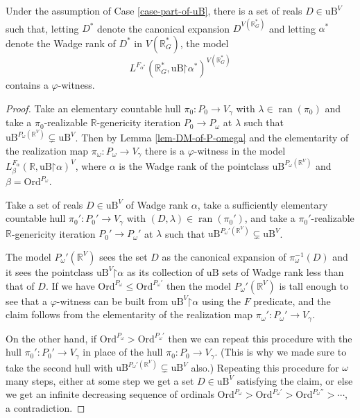 \documentclass[fleqn, 11pt]{amsart}
\theoremstyle{plain}
\theoremstyle{definition}
\theoremstyle{remark}
\newcommand{\Ord}{\mathrm{Ord}}
\newcommand{\uB}{\mathrm{uB}}
\newcommand{\restrict}{\mathord{\restriction}}
\DeclareMathOperator{\ran}{ran}
\begin{document}
\begin{claim*}
 Under the assumption of Case \ref{case-part-of-uB}, there is a
 set of reals $D \in \uB^V$ such that, letting $D^*$ denote the canonical expansion $D^{V(\mathbb{R}^*_G)}$ and letting $\alpha^*$ denote the Wadge rank of $D^*$ in $V(\mathbb{R}^*_G)$, the model
\[L^{F_{\alpha^*}}(\mathbb{R}^*_G, \uB \restrict \alpha^*)^{V(\mathbb{R}^*_G)}\]
 contains a $\varphi$-witness.
\end{claim*}

\begin{proof}
 Take an elementary countable hull $\pi_0 \colon P_0 \to V_{\gamma}$ with $\lambda \in \ran(\pi_0)$ and take a $\pi_0$-realizable $\mathbb{R}$-genericity iteration $P_0\to P_\omega$ at $\lambda$ such that $\uB^{P_\omega(\mathbb{R}^V)} \subsetneq \uB^V$. Then by Lemma \ref{lem-DM-of-P-omega} and the elementarity of the realization map $\pi_\omega \colon P_\omega \to V_{\gamma}$ there is a $\varphi$-witness in the model $L^{F_\alpha}_\beta(\mathbb{R}, \uB \restrict \alpha)^V$, where $\alpha$ is the Wadge rank of the pointclass $\uB^{P_\omega(\mathbb{R}^V)}$ and $\beta = \Ord^{P_\omega}$.

 Take a set of reals $D \in \uB^V$ of Wadge rank $\alpha$, take a sufficiently elementary countable hull $\pi_0' \colon P_0' \to V_{\gamma}$ with $(D, \lambda) \in \ran(\pi_0')$, and take a $\pi_0'$-realizable $\mathbb{R}$-genericity iteration $P_0'\to P_\omega'$ at $\lambda$ such that $\uB^{P_\omega'(\mathbb{R}^V)} \subsetneq \uB^V$.

 The model $P_\omega'(\mathbb{R}^V)$ sees the set $D$ as the canonical expansion of $\pi_\omega^{-1}(D)$ and it sees the pointclass $\uB^V \restrict \alpha$ as its collection of $\uB$ sets of Wadge rank less than that of $D$. If we have $\Ord^{P_\omega} \le \Ord^{P_\omega'}$ then the model $P_\omega'(\mathbb{R}^V)$ is tall enough to see that a $\varphi$-witness can be built from $\uB^V \restrict \alpha$ using the $F$ predicate, and the claim follows from the elementarity of the realization map $\pi_\omega' \colon P_\omega' \to V_{\gamma}$.

 On the other hand, if $\Ord^{P_\omega} > \Ord^{P_\omega'}$ then we can repeat this procedure with the hull $\pi_0' \colon P_0' \to V_{\gamma}$ in place of the hull $\pi_0 \colon P_0 \to V_{\gamma}$.  (This is why we made sure to take the second hull with $\uB^{P_\omega'(\mathbb{R}^V)} \subsetneq \uB^V$ also.) Repeating this procedure for $\omega$ many steps,
 either at some step we get a set $D \in \uB^V$ satisfying the claim, or else we get an infinite decreasing sequence of ordinals $\Ord^{P_\omega} > \Ord^{P_\omega'} > \Ord^{P_\omega''} > \cdots$, a contradiction.
\end{proof}
\end{document}
